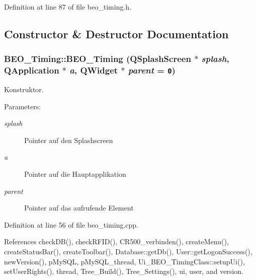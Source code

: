 Definition at line 87 of file beo\_\-timing.h.

\subsection{Constructor \& Destructor Documentation}
\hypertarget{class_b_e_o___timing_1adf7a002a9712fefe2f68007d2112e9}{
\subsubsection[BEO\_\-Timing]{\setlength{\rightskip}{0pt plus 5cm}BEO\_\-Timing::BEO\_\-Timing (QSplashScreen $\ast$ {\em splash}, \/  QApplication $\ast$ {\em a}, \/  QWidget $\ast$ {\em parent} = {\tt 0})}}
\label{class_b_e_o___timing_1adf7a002a9712fefe2f68007d2112e9}


Konstruktor. 

\begin{Desc}
\item[Parameters:]
\begin{description}
\item[{\em splash}]Pointer auf den Splashscreen \item[{\em a}]Pointer auf die Hauptapplikation \item[{\em parent}]Pointer auf das aufrufende Element \end{description}
\end{Desc}


Definition at line 56 of file beo\_\-timing.cpp.

References checkDB(), checkRFID(), CR500\_\-verbinden(), createMenu(), createStatusBar(), createToolbar(), Database::getDb(), User::getLogonSuccess(), newVersion(), pMySQL, pMySQL\_\-thread, Ui\_\-BEO\_\-TimingClass::setupUi(), setUserRights(), thread, Tree\_\-Build(), Tree\_\-Settings(), ui, user, and version.

